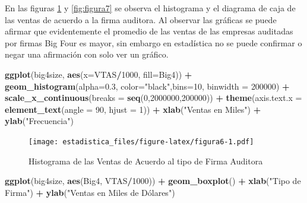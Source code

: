 \documentclass[]{book}
\newenvironment{Shaded}{\begin{snugshade}}{\end{snugshade}}
\newcommand{\KeywordTok}[1]{\textcolor[rgb]{0.13,0.29,0.53}{\textbf{#1}}}
\newcommand{\DataTypeTok}[1]{\textcolor[rgb]{0.13,0.29,0.53}{#1}}
\newcommand{\DecValTok}[1]{\textcolor[rgb]{0.00,0.00,0.81}{#1}}
\newcommand{\FloatTok}[1]{\textcolor[rgb]{0.00,0.00,0.81}{#1}}
\newcommand{\StringTok}[1]{\textcolor[rgb]{0.31,0.60,0.02}{#1}}
\newcommand{\OperatorTok}[1]{\textcolor[rgb]{0.81,0.36,0.00}{\textbf{#1}}}
\newcommand{\NormalTok}[1]{#1}
\begin{document}
En las figuras \ref{fig:figura6} y \ref{fig:figura7} se observa el
histograma y el diagrama de caja de las ventas de acuerdo a la firma
auditora. Al observar las gráficas se puede afirmar que evidentemente el
promedio de las ventas de las empresas auditadas por firmas Big Four es
mayor, sin embargo en estadística no se puede confirmar o negar una
afirmación con solo ver un gráfico.

\begin{Shaded}
\begin{Highlighting}[]
\KeywordTok{ggplot}\NormalTok{(big4size, }\KeywordTok{aes}\NormalTok{(}\DataTypeTok{x=}\NormalTok{VTAS}\OperatorTok{/}\DecValTok{1000}\NormalTok{, }\DataTypeTok{fill=}\NormalTok{Big4)) }\OperatorTok{+}\StringTok{ }
\StringTok{  }\KeywordTok{geom_histogram}\NormalTok{(}\DataTypeTok{alpha=}\FloatTok{0.3}\NormalTok{, }\DataTypeTok{color=}\StringTok{"black"}\NormalTok{,}\DataTypeTok{bins=}\DecValTok{10}\NormalTok{, }\DataTypeTok{binwidth =} \DecValTok{200000}\NormalTok{) }\OperatorTok{+}
\StringTok{  }\KeywordTok{scale_x_continuous}\NormalTok{(}\DataTypeTok{breaks =} \KeywordTok{seq}\NormalTok{(}\DecValTok{0}\NormalTok{,}\DecValTok{2000000}\NormalTok{,}\DecValTok{200000}\NormalTok{)) }\OperatorTok{+}
\StringTok{  }\KeywordTok{theme}\NormalTok{(}\DataTypeTok{axis.text.x =} \KeywordTok{element_text}\NormalTok{(}\DataTypeTok{angle =} \DecValTok{90}\NormalTok{, }\DataTypeTok{hjust =} \DecValTok{1}\NormalTok{)) }\OperatorTok{+}
\StringTok{  }\KeywordTok{xlab}\NormalTok{(}\StringTok{"Ventas en Miles"}\NormalTok{) }\OperatorTok{+}\StringTok{ }\KeywordTok{ylab}\NormalTok{(}\StringTok{"Frecuencia"}\NormalTok{) }
\end{Highlighting}
\end{Shaded}

\begin{figure}
\centering
\texttt{[image: estadistica\_files/figure-latex/figura6-1.pdf]}
\caption{\label{fig:figura6}Histograma de las Ventas de Acuerdo al tipo de
Firma Auditora}
\end{figure}

\begin{Shaded}
\begin{Highlighting}[]
\KeywordTok{ggplot}\NormalTok{(big4size, }\KeywordTok{aes}\NormalTok{(Big4, VTAS}\OperatorTok{/}\DecValTok{1000}\NormalTok{)) }\OperatorTok{+}\StringTok{ }
\StringTok{  }\KeywordTok{geom_boxplot}\NormalTok{() }\OperatorTok{+}\StringTok{ }\KeywordTok{xlab}\NormalTok{(}\StringTok{"Tipo de Firma"}\NormalTok{) }\OperatorTok{+}
\StringTok{  }\KeywordTok{ylab}\NormalTok{(}\StringTok{"Ventas en Miles de Dólares")}
\end{Highlighting}
\end{Shaded}
\end{document}
